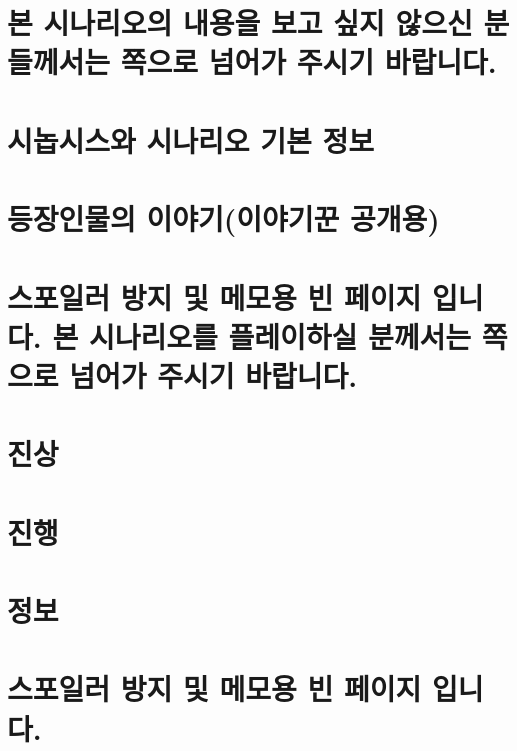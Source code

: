 \documentclass{report}
\begin{document}
	\chapter*{본 시나리오의 내용을 보고 싶지 않으신 분들께서는 \pageref{endof_Tower}쪽으로 넘어가 주시기 바랍니다.}
	
	\chapter{시놉시스와 시나리오 기본 정보}
	
	\chapter{등장인물의 이야기(이야기꾼 공개용)}
	
	\chapter*{스포일러 방지 및 메모용 빈 페이지 입니다. 본 시나리오를 플레이하실 분께서는 \pageref{endof_Unliving}쪽으로 넘어가 주시기 바랍니다.}
	
	\parttoc
	
	\chapter{진상}
		
	
	\chapter{진행}
		
	
	\chapter{정보}
	\hypertarget{tower:information}{}
		
	\chapter*{스포일러 방지 및 메모용 빈 페이지 입니다.}
\end{document}
